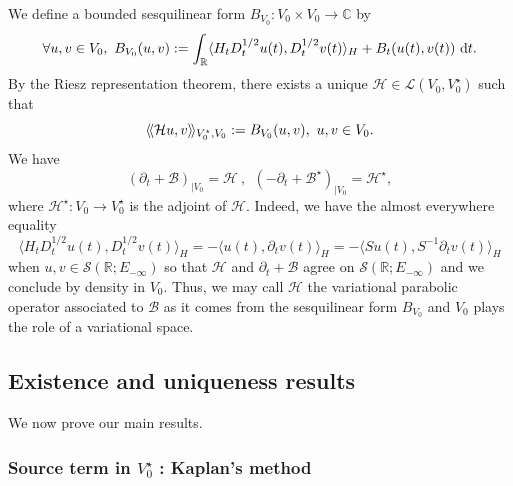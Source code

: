 \documentclass[11pt, letterpaper]{amsart}
\theoremstyle{definition}
\theoremstyle{remark}
\newcommand{\llangle}{\langle\!\langle}
\newcommand{\rrangle}{\rangle\!\rangle}
\numberwithin{equation}{section}
\begin{document}
{We define a bounded sesquilinear form $B_{V_0}: V_0 \times V_0 \rightarrow \mathbb{C}$ by  
\begin{equation*}\label{B_{V_0}}
    \forall u,v \in V_0, \ B_{V_0}(u,v):=\int_\mathbb{R}\langle H_t D_t^{1/2}u(t), D_t^{1/2}v(t) \rangle_H + B_t(u(t),v(t))\ \mathrm dt. 
\end{equation*}
By the Riesz representation theorem, there exists a unique $\mathcal{H} \in \mathcal{L}(V_0,V_0^\star)$ such that 
\begin{equation*}\label{eq:mathcal{H}}\llangle \mathcal{H}u, v \rrangle_{V_0^\star, V_0}:= B_{V_0}(u,v), \ u,v \in V_0.
\end{equation*}
We have 
\begin{equation*}\label{H et part + B}
   \left ( \partial_t+\mathcal{B} \right )_{\scriptscriptstyle{\vert V_0}} = \mathcal{H} \ , \ \ \left ( -\partial_t+\mathcal{B}^\star \right )_{\scriptscriptstyle{\vert V_0}} = \mathcal{H}^\star, 
\end{equation*}
where $\mathcal{H}^\star : V_0 \rightarrow V_0^\star$ is the adjoint of $\mathcal{H}$.
Indeed, we have the almost everywhere equality $$\langle H_t D_t^{1/2}u(t), D_t^{1/2}v(t) \rangle_H=-\langle u(t), \partial_t v(t) \rangle_{H}=-\langle Su(t), S^{-1}\partial_t v(t) \rangle_{H} $$
when $u,v \in \mathcal{S}(\mathbb{R};E_{-\infty})$ so that $\mathcal{H}$ and $\partial_t+\mathcal{B} $ agree on $\mathcal{S}(\mathbb{R};E_{-\infty})$ and we conclude by density in $V_0$. Thus, we may call $\mathcal{H}$ the variational parabolic operator associated to $\mathcal{B}$ as it comes from the sesquilinear form $B_{V_0}$  and $V_0$ plays the role of a variational space.

\subsection{Existence and uniqueness results}\label{S2S5} 
We now prove our main results.

\subsubsection{Source term in $V_0^\star$ : Kaplan's method}


}
\end{document}
